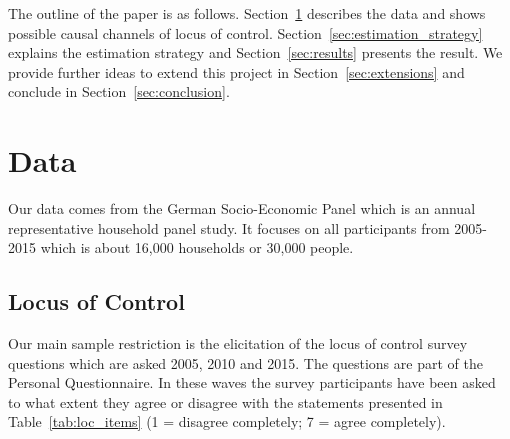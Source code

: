 \documentclass[12pt, a4paper, fleqn, parskip]{scrartcl}
\begin{document}
The outline of the paper is as follows. Section~\ref{sec:data} describes the
data and shows possible causal channels of locus of control.
Section~\ref{sec:estimation_strategy} explains the estimation strategy and
Section~\ref{sec:results} presents the result. We provide further ideas to
extend this project in Section~\ref{sec:extensions} and conclude in
Section~\ref{sec:conclusion}.

\section{Data}
\label{sec:data}

Our data comes from the German Socio-Economic Panel \citep{gsoep2017} which is
an annual representative household panel study. It focuses on all participants
from 2005-2015 which is about 16,000 households or 30,000 people.

\subsection{Locus of Control} %
\label{sub:locus_of_control}

Our main sample restriction is the elicitation of the locus of control survey
questions which are asked 2005, 2010 and 2015. The questions are part of the
Personal Questionnaire. In these waves the survey participants have been asked
to what extent they agree or disagree with the statements presented in
Table~\ref{tab:loc_items} (1 = disagree completely; 7 = agree completely).
\end{document}
